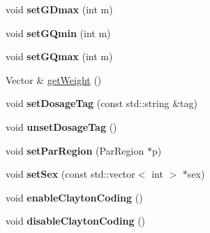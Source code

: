\begin{DoxyCompactItemize}
\item 
\hypertarget{classGenotypeExtractor_aebb1afb9de7eee2cd62da0bfbf3bba7c}{void {\bfseries set\-G\-Dmax} (int m)}\label{classGenotypeExtractor_aebb1afb9de7eee2cd62da0bfbf3bba7c}

\item 
\hypertarget{classGenotypeExtractor_a27ff068f92acf500eb07f3b4ad9e7aea}{void {\bfseries set\-G\-Qmin} (int m)}\label{classGenotypeExtractor_a27ff068f92acf500eb07f3b4ad9e7aea}

\item 
\hypertarget{classGenotypeExtractor_ade3ad5e5dfc254ef22e3692f7ac00c67}{void {\bfseries set\-G\-Qmax} (int m)}\label{classGenotypeExtractor_ade3ad5e5dfc254ef22e3692f7ac00c67}

\item 
Vector \& \hyperlink{classGenotypeExtractor_ab924228dcf705f329804acebca1df812}{get\-Weight} ()
\item 
\hypertarget{classGenotypeExtractor_ab488139105b763cb4ee6c29c95ea8893}{void {\bfseries set\-Dosage\-Tag} (const std\-::string \&tag)}\label{classGenotypeExtractor_ab488139105b763cb4ee6c29c95ea8893}

\item 
\hypertarget{classGenotypeExtractor_ab9962575d690cff556bc62d350079321}{void {\bfseries unset\-Dosage\-Tag} ()}\label{classGenotypeExtractor_ab9962575d690cff556bc62d350079321}

\item 
\hypertarget{classGenotypeExtractor_aeb13746f85a90205c694095bb39d3270}{void {\bfseries set\-Par\-Region} (Par\-Region $\ast$p)}\label{classGenotypeExtractor_aeb13746f85a90205c694095bb39d3270}

\item 
\hypertarget{classGenotypeExtractor_aca852e602aedb79687feb339db55f741}{void {\bfseries set\-Sex} (const std\-::vector$<$ int $>$ $\ast$sex)}\label{classGenotypeExtractor_aca852e602aedb79687feb339db55f741}

\item 
\hypertarget{classGenotypeExtractor_a869c1288481f87a22d150f7dcb660ab3}{void {\bfseries enable\-Clayton\-Coding} ()}\label{classGenotypeExtractor_a869c1288481f87a22d150f7dcb660ab3}

\item 
\hypertarget{classGenotypeExtractor_ac8490f1cee6ace4d9a32e99d8a06b935}{void {\bfseries disable\-Clayton\-Coding} ()}\label{classGenotypeExtractor_ac8490f1cee6ace4d9a32e99d8a06b935}

\end{DoxyCompactItemize}
